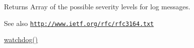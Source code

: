 \begin{DoxyReturn}{Returns}
Array of the possible severity levels for log messages.
\end{DoxyReturn}
\begin{DoxySeeAlso}{See also}
\href{http://www.ietf.org/rfc/rfc3164.txt}{\tt http://www.ietf.org/rfc/rfc3164.txt} 

\hyperlink{bootstrap_8inc_acb7338e6740302727043d64e3ae1257b}{watchdog()} 
\end{DoxySeeAlso}
